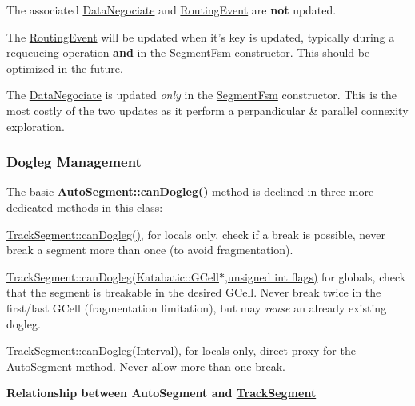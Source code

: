 The associated \hyperlink{classKite_1_1DataNegociate}{Data\-Negociate} and \hyperlink{classKite_1_1RoutingEvent}{Routing\-Event} are {\bfseries not} updated.
\begin{DoxyItemize}
\item The \hyperlink{classKite_1_1RoutingEvent}{Routing\-Event} will be updated when it's key is updated, typically during a requeueing operation {\bfseries and} in the \hyperlink{classKite_1_1SegmentFsm}{Segment\-Fsm} constructor. This should be optimized in the future.
\item The \hyperlink{classKite_1_1DataNegociate}{Data\-Negociate} is updated {\itshape only} in the \hyperlink{classKite_1_1SegmentFsm}{Segment\-Fsm} constructor. This is the most costly of the two updates as it perform a perpandicular \& parallel connexity exploration.
\end{DoxyItemize}\hypertarget{classKite_1_1TrackSegment_secDogleg}{}\subsubsection{Dogleg Management}\label{classKite_1_1TrackSegment_secDogleg}
The basic {\bf Auto\-Segment\-::can\-Dogleg()} method is declined in three more dedicated methods in this class\-:
\begin{DoxyItemize}
\item \hyperlink{classKite_1_1TrackSegment_aa0bb6f1592688e942ff67e0ac318a4fd}{Track\-Segment\-::can\-Dogleg()}, for locals only, check if a break is possible, never break a segment more than once (to avoid fragmentation).
\item \hyperlink{classKite_1_1TrackSegment_a4f040cf33009e4886d401115c3bea838}{Track\-Segment\-::can\-Dogleg(\-Katabatic\-::\-G\-Cell$\ast$,unsigned int flags)} for globals, check that the segment is breakable in the desired G\-Cell. Never break twice in the first/last G\-Cell (fragmentation limitation), but may {\itshape reuse} an already existing dogleg.
\item \hyperlink{classKite_1_1TrackSegment_accb4c6a7ee2678a0cff4dbc4a7860fe1}{Track\-Segment\-::can\-Dogleg(\-Interval)}, for locals only, direct proxy for the Auto\-Segment method. Never allow more than one break.
\end{DoxyItemize}

{\bfseries Relationship between Auto\-Segment and \hyperlink{classKite_1_1TrackSegment}{Track\-Segment}}

